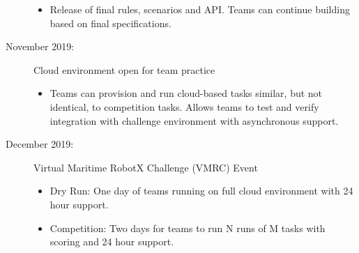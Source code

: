 \documentclass[11pt]{article}
\begin{document}
\begin{description}
\begin{itemize}
  \item Release of final rules, scenarios and API.  Teams can continue building based on final specifications.
  \end{itemize}  
\item[November 2019:] Cloud environment open for team practice
  \begin{itemize}
  \item Teams can provision and run cloud-based tasks similar, but not identical, to competition tasks.  Allows teams to test and verify integration with challenge environment with asynchronous support.
  \end{itemize}
\item[December 2019:] Virtual Maritime RobotX Challenge (VMRC) Event
  \begin{itemize}
  \item Dry Run: One day of teams running on full cloud environment with 24 hour support.
  \item Competition: Two days for teams to run N runs of M tasks with scoring and 24 hour support.
  \end{itemize}
\end{description}



\newpage
\setcounter{page}{1}


\end{document}
